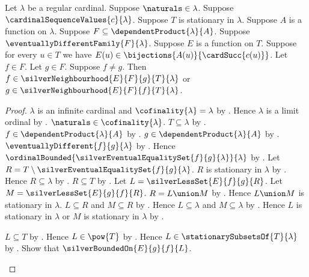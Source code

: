 \begin{theorem}\label{silver_neighbourhood_orientation}
    Let $\lambda$ be a regular cardinal.
    Suppose $\naturals\in\lambda$.
    Suppose $\cardinalSequenceValues{c}{\lambda}$.
    Suppose $T$ is stationary in $\lambda$.
    Suppose $A$ is a function on $\lambda$.
    Suppose $F\subseteq\dependentProduct{\lambda}{A}$.
    Suppose $\eventuallyDifferentFamily{F}{\lambda}$.
    Suppose $E$ is a function on $T$.
    Suppose for every $u\in T$ we have
        $E(u)\in\bijections{A(u)}{\cardSucc{c(u)}}$.
    Let $f\in F$.
    Let $g\in F$.
    Suppose $f\neq g$.
    Then $f\in\silverNeighbourhood{E}{F}{g}{T}{\lambda}$ or
        $g\in\silverNeighbourhood{E}{F}{f}{T}{\lambda}$.
\end{theorem}
\begin{proof}
    $\lambda$ is an infinite cardinal and
        $\cofinality{\lambda}=\lambda$ by .
    Hence $\lambda$ is a limit ordinal
        by .
    $\naturals\in\cofinality{\lambda}$.
    $T\subseteq\lambda$ by .
    $f\in\dependentProduct{\lambda}{A}$ by .
    $g\in\dependentProduct{\lambda}{A}$ by .
    $\eventuallyDifferent{f}{g}{\lambda}$
        by .
    Hence $\ordinalBounded{
        \silverEventualEqualitySet{f}{g}{\lambda}}{\lambda}$
        by .
    Let $R=T\setminus\silverEventualEqualitySet{f}{g}{\lambda}$.
    $R$ is stationary in $\lambda$
        by .
    Hence $R\subseteq\lambda$ by .
    $R\subseteq T$ by .
    Let $L=\silverLessSet{E}{f}{g}{R}$.
    Let $M=\silverLessSet{E}{g}{f}{R}$.
    $R=L\union M$ by .
    Hence $L\union M$ is stationary in $\lambda$.
    $L\subseteq R$ and $M\subseteq R$
        by .
    Hence $L\subseteq\lambda$ and $M\subseteq\lambda$
        by .
    Hence $L$ is stationary in $\lambda$ or
        $M$ is stationary in $\lambda$
        by .
    \begin{byCase}
            $L\subseteq T$ by .
            Hence $L\in\pow{T}$ by .
            Hence $L\in\stationarySubsetsOf{T}{\lambda}$
                by .
            Show that $\silverBoundedOn{E}{g}{f}{L}$.

\end{byCase}
\end{proof}
